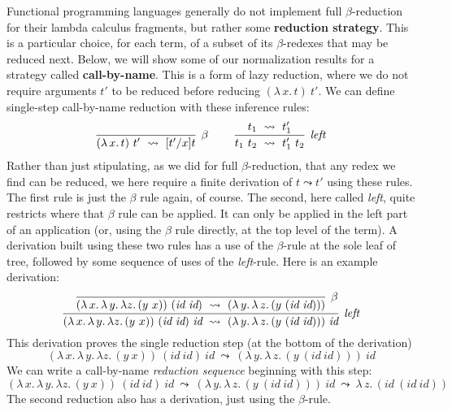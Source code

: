 \documentclass{article}
\begin{document}
Functional programming languages generally do not implement full
$\beta$-reduction for their lambda calculus fragments, but rather some
\textbf{reduction strategy}.  This is a particular choice, for each
term, of a subset of its $\beta$-redexes that may be reduced next.
Below, we will show some of our normalization results for a strategy
called \textbf{call-by-name}.  This is a form of lazy reduction, where
we do not require arguments $t'$ to be reduced before reducing
$(\lambda\,x.\, t)\ t'$.  We can define single-step call-by-name
reduction with these inference rules:
\[
\begin{array}{lll}
\infer[\beta]{(\lambda\,x.\, t)\ t'\ \leadsto\ [t'/x]t}
      {\ }
&\ &
\infer[\textit{left}]{t_1\ t_2\ \leadsto\ t_1'\ t_2}
      {t_1\ \leadsto\ t_1'}
\end{array}
\]
\noindent Rather than just stipulating, as we did for full
$\beta$-reduction, that any redex we find can be reduced, we here
require a finite derivation of $t\leadsto t'$ using these rules.  The
first rule is just the $\beta$ rule again, of course.  The second,
here called \emph{left},
quite restricts where that $\beta$ rule can be applied.  It can only
be applied in the left part of an application (or, using the $\beta$
rule directly, at the top level of the term).
A derivation built using these two rules has a use of the $\beta$-rule at the sole leaf of tree,
followed by some sequence of uses of the \emph{left}-rule.   Here is an example derivation:
\[
\infer[\textit{left}]
      {(\lambda\,x.\, \lambda\,y.\, \lambda z.\, (y\ x))\ (\textit{id}\ \textit{id}) \ \textit{id}\ \leadsto\
      (\lambda\,y.\, \lambda\,z.\, (y\ (\textit{id}\ \textit{id})))\ \textit{id}}
      {\infer[\beta]{(\lambda\,x.\, \lambda\,y.\, \lambda z.\, (y\ x))\ (\textit{id}\ \textit{id})\ \leadsto\
          (\lambda\,y.\, \lambda\,z.\, (y\ (\textit{id}\ \textit{id})))}{\ }}
      \]
\noindent This derivation proves the single reduction step (at the bottom of the derivation)
  \[
(\lambda\,x.\, \lambda\,y.\, \lambda z.\, (y\ x))\ (\textit{id}\ \textit{id}) \ \textit{id}\ \leadsto\
(\lambda\,y.\, \lambda\,z.\, (y\ (\textit{id}\ \textit{id})))\ \textit{id}
\]
\noindent We can write a call-by-name \emph{reduction sequence} beginning with this step:
\[
(\lambda\,x.\, \lambda\,y.\, \lambda z.\, (y\ x))\ (\textit{id}\ \textit{id}) \ \textit{id}\ \leadsto\
(\lambda\,y.\, \lambda\,z.\, (y\ (\textit{id}\ \textit{id})))\ \textit{id}\ \leadsto\
\lambda\,z.\, (\textit{id}\ (\textit{id}\ \textit{id}))
\]
\noindent The second reduction also has a derivation, just using the $\beta$-rule.
\end{document}
